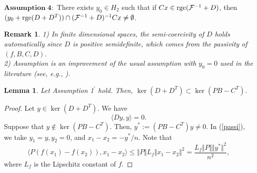 \documentclass[11pt]{article}
\theoremstyle{plain}
\newtheorem{remark}{Remark}
\newtheorem{lemma}[theorem]{Lemma}
\begin{document}
{   \noindent$\mathbf{Assumption \;4}:$  There exists $y_0\in H_2$ such that   if  $Cx\in {\rm rge}({\mathcal{F}}^{-1}+D)$, then  $ (y_0+{\rm rge}(D+D^T) )\cap (\mathcal{F}^{-1}+D)^{-1}Cx\neq \emptyset$. 
   \begin{remark}
 1) In finite dimensional spaces, the semi-coercivity of $D$ holds automatically since $D$ is positive semidefinite, which comes from the passivity of $(f,B,C,D)$.\\
 2) Assumption  is an improvement of the usual assumption with $y_0=0$ used in the literature (see, e.g., \cite{L1,L2,tbc}).
\end{remark}
 \begin{lemma} \label{kersub}
  Let Assumption 1$^\prime$ hold. Then, $\ker(D+D^T)\subset \ker(PB-C^T)$.
   \end{lemma} 
   \begin{proof}
   Let $y\in \ker(D+D^T)$. We have 
   $$
   \langle Dy,y\rangle=0.
   $$
   Suppose that $y\notin \ker(PB-C^T)$. Then, $y^*:=(PB-C^T)y\neq 0$.   In (\ref{passi}), we take $y_1=y, y_2=0$, and $x_1-x_2=-y^*/n$. Note that 
   $$
   \langle P(f(x_1)-f(x_2)), x_1-x_2 \rangle \le \Vert P \Vert L_f \Vert x_1-x_2 \Vert^2=\frac{L_f \Vert P \Vert \Vert y^* \Vert^2 }{n^2},
   $$
   where $L_f$ is the Lipschitz constant of $f$. 
   

\end{proof}}
\end{document}
